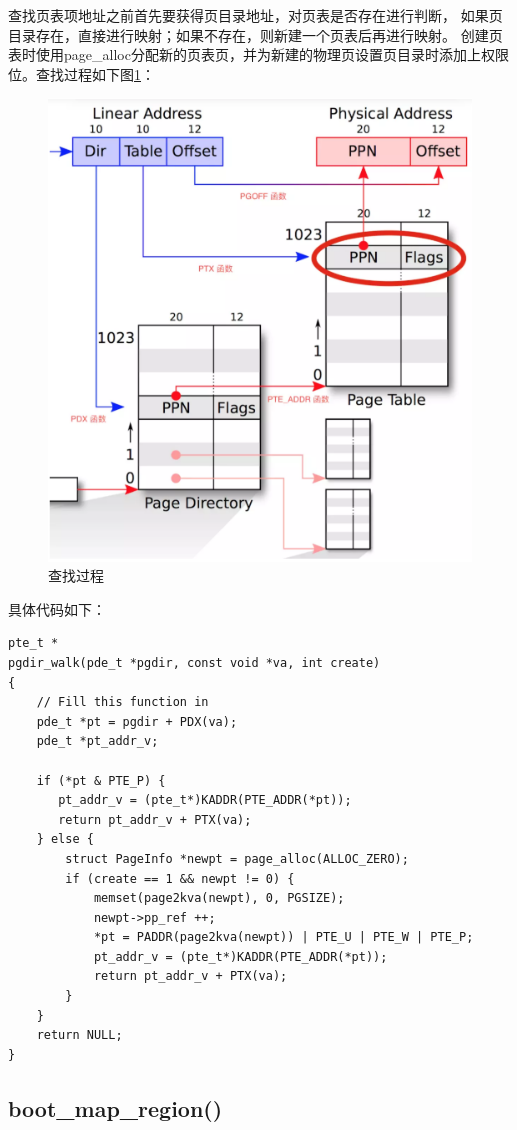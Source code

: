 \documentclass[12pt,a4paper,UTF8]{article}
\begin{document}
    查找页表项地址之前首先要获得页目录地址，对页表是否存在进行判断，
    如果页目录存在，直接进行映射；如果不存在，则新建一个页表后再进行映射。
    创建页表时使用page\_alloc分配新的页表页，并为新建的物理页设置页目录时添加上权限位。查找过程如下图\ref{fig::figure1}：

    \begin{figure}[H]
        \centering
        \includegraphics[width = .75\linewidth]{img/1.png}
        \caption{查找过程}
        \label{fig::figure1}
    \end{figure}

    具体代码如下：

    \begin{lstlisting}[style=CPP]
pte_t *
pgdir_walk(pde_t *pgdir, const void *va, int create)
{
	// Fill this function in
	pde_t *pt = pgdir + PDX(va);
   	pde_t *pt_addr_v;

    if (*pt & PTE_P) {
   	   pt_addr_v = (pte_t*)KADDR(PTE_ADDR(*pt));
   	   return pt_addr_v + PTX(va);
   	} else {
	    struct PageInfo *newpt = page_alloc(ALLOC_ZERO);
        if (create == 1 && newpt != 0) {
            memset(page2kva(newpt), 0, PGSIZE);
            newpt->pp_ref ++;
            *pt = PADDR(page2kva(newpt)) | PTE_U | PTE_W | PTE_P;
            pt_addr_v = (pte_t*)KADDR(PTE_ADDR(*pt));
            return pt_addr_v + PTX(va);
        }
    }
	return NULL;
}
    \end{lstlisting}

    \subsection{boot\_map\_region()}
\end{document}

